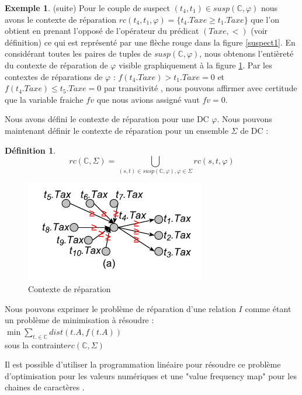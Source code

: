 \documentclass[letterpaper, 12pt]{report}
\theoremstyle{definition}
\newtheorem{mydef}{Définition}
\newtheorem{myexample}{Exemple}
\begin{document}
\begin{myexample} (suite)
Pour le couple de suspect $(t_4,t_1) \in susp(\mathbb{C},\varphi)$ nous avons le contexte de réparation $rc(t_4,t_1,\varphi) = \{ t_4.Taxe \geq t_1.Taxe \}$ que l'on obtient en prenant l'opposé de l'opérateur du prédicat $(Taxe, <)$ (voir définition) ce qui est représenté par une flèche rouge dans la figure \ref{suspect1}. En considérant toutes les paires de tuples de $susp(\mathbb{C},\varphi)$, nous obtenons l'entièreté du contexte de réparation de $\varphi$ visible graphiquement à la figure \ref{context}. Par les contextes de réparations de $\varphi$ : $f(t_4.Taxe) > t_1.Taxe = 0$ et $f(t_4.Taxe) \leq t_5.Taxe = 0$ par transitivité , nous pouvons affirmer avec certitude que la variable fraiche $fv$ que nous avions assigné vaut $fv = 0$.
\end{myexample}

Nous avons défini le contexte de réparation pour une DC $\varphi$. Nous pouvons maintenant définir le contexte de réparation pour un ensemble $\Sigma$ de DC : 
\begin{mydef}
	$$rc(\mathbb{C},\Sigma) = \bigcup_{(s,t) \in susp(\mathbb{C},\varphi), \varphi \in  \Sigma} rc(s,t,\varphi)$$
\end{mydef}

\begin{figure}
\centering
\includegraphics[scale=1]{img/context.png}
\caption{\label{context} Contexte de réparation}
\end{figure}

Nous pouvons exprimer le problème de réparation d'une relation $I$ comme étant un problème de minimisation à résoudre : \\

$\min \sum_{t. \in \mathbb{C}} dist(t.A,f(t.A))$ \\
sous la contrainte$ rc(\mathbb{C} , \Sigma)$

Il est possible d'utiliser la programmation linéaire pour résoudre ce problème d'optimisation pour les valeurs numériques et une "value frequency map" pour les chaines de caractères \cite{main}.\\
\end{document}
